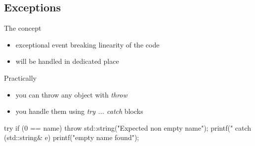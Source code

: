 \subsection[except]{Exceptions}

\begin{frame}[fragile]
  \begin{block}{The concept}
    \begin{itemize}
    \item exceptional event breaking linearity of the code
    \item will be handled in dedicated place
    \end{itemize}
  \end{block}
  \begin{block}{Practically}
    \begin{itemize}
    \item you can throw any object with {\it throw}
    \item you handle them using {\it try ... catch} blocks
    \end{itemize}
  \end{block}
  \begin{cppcode}
    try {
      if (0 == name) {
        throw std::string("Expected non empty name");
      }
      printf("%
    } catch (std::string& e) {
      printf("empty name found\n");
    }
  \end{cppcode}
\end{frame}

